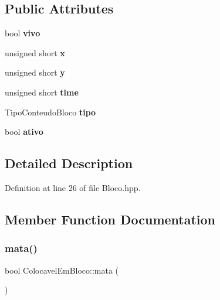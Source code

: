 \subsection*{Public Attributes}
\begin{DoxyCompactItemize}
\item 
\mbox{\label{class_colocavel_em_bloco_a8c5d017d88f31ff3d8e5dfb01ac92d76}} 
bool {\bfseries vivo}
\item 
\mbox{\label{class_colocavel_em_bloco_ae0ab0d922be3835d8fa523a8b16769bf}} 
unsigned short {\bfseries x}
\item 
\mbox{\label{class_colocavel_em_bloco_ac43768b1cb415acedb4edd9c678f7895}} 
unsigned short {\bfseries y}
\item 
\mbox{\label{class_colocavel_em_bloco_af766227d1bcfb9858a0d80a623bcc283}} 
unsigned short {\bfseries time}
\item 
\mbox{\label{class_colocavel_em_bloco_a988a57fa9f64a350685d6e9d05cf2643}} 
Tipo\+Conteudo\+Bloco {\bfseries tipo}
\item 
\mbox{\label{class_colocavel_em_bloco_a5b6576486062c11fce316071d1535137}} 
bool {\bfseries ativo}
\end{DoxyCompactItemize}


\subsection{Detailed Description}


Definition at line 26 of file Bloco.\+hpp.



\subsection{Member Function Documentation}
\mbox{\label{class_colocavel_em_bloco_a89177aadb9f7fd73431adcb29b90f887}} 
\subsubsection{\texorpdfstring{mata()}{mata()}}
{\footnotesize\ttfamily bool Colocavel\+Em\+Bloco\+::mata (\begin{DoxyParamCaption}{ }\end{DoxyParamCaption})}

